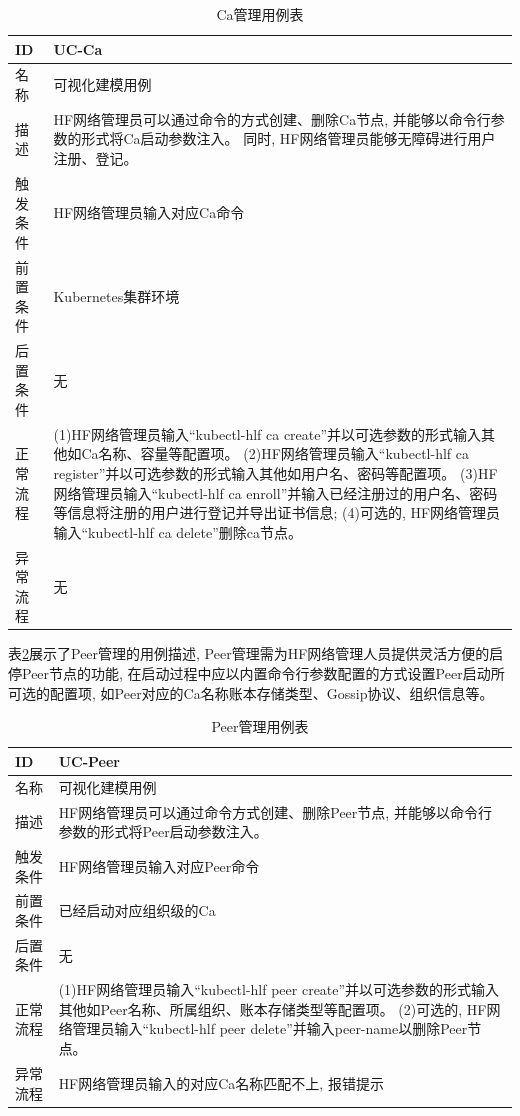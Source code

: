 {\footnotesize
\begin{longtable}[h]{m{60pt}|m{280pt}}
    \caption[Ca管理用例表]{Ca管理用例表} \label{ca_use_case} \\
        \hline  
        ID&UC-Ca\\
        \hline
        名称&可视化建模用例\\
        \hline
        描述&HF网络管理员可以通过命令的方式创建、删除Ca节点, 并能够以命令行参数的形式将Ca启动参数注入。 同时, HF网络管理员能够无障碍进行用户注册、登记。\\
        \hline
        触发条件&HF网络管理员输入对应Ca命令\\
        \hline
        前置条件&Kubernetes集群环境\\
        \hline
        后置条件&无\\
        \hline
        正常流程& (1)HF网络管理员输入“kubectl-hlf ca create”并以可选参数的形式输入其他如Ca名称、容量等配置项。
        \newline (2)HF网络管理员输入“kubectl-hlf ca register”并以可选参数的形式输入其他如用户名、密码等配置项。
        \newline (3)HF网络管理员输入“kubectl-hlf ca enroll”并输入已经注册过的用户名、密码等信息将注册的用户进行登记并导出证书信息;
        \newline (4)可选的, HF网络管理员输入“kubectl-hlf ca delete”删除ca节点。\\
        \hline
        异常流程&无\\
        \hline
    \end{longtable} 
}

表\ref{peer_use_case}展示了Peer管理的用例描述, Peer管理需为HF网络管理人员提供灵活方便的启停Peer节点的功能, 在启动过程中应以内置命令行参数配置的方式设置Peer启动所可选的配置项, 如Peer对应的Ca名称账本存储类型、Gossip协议、组织信息等。

{\footnotesize
\begin{longtable}[h]{m{60pt}|m{280pt}}
    \caption[Peer管理用例表]{Peer管理用例表} \label{peer_use_case} \\
        \hline  
        ID&UC-Peer\\
        \hline
        名称&可视化建模用例\\
        \hline
        描述&HF网络管理员可以通过命令方式创建、删除Peer节点, 并能够以命令行参数的形式将Peer启动参数注入。\\
        \hline
        触发条件&HF网络管理员输入对应Peer命令\\
        \hline
        前置条件&已经启动对应组织级的Ca\\
        \hline
        后置条件&无\\
        \hline
        正常流程& (1)HF网络管理员输入“kubectl-hlf peer create”并以可选参数的形式输入其他如Peer名称、所属组织、账本存储类型等配置项。
        \newline (2)可选的, HF网络管理员输入“kubectl-hlf peer delete”并输入peer-name以删除Peer节点。\\
        \hline
        异常流程& HF网络管理员输入的对应Ca名称匹配不上, 报错提示\\
        \hline
    \end{longtable} 
}


